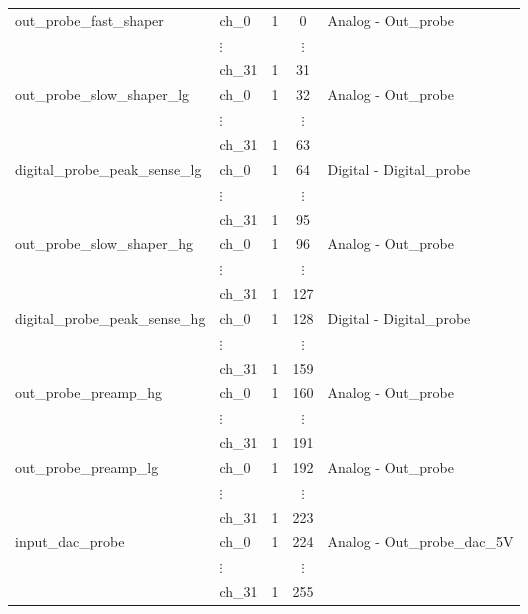 \begin{longtable}{|p{5cm}|p{2cm}|c|c|p{6cm}|}
    out\_probe\_fast\_shaper       & ch\_0   & 1 & 0   & Analog - Out\_probe \\
                                   & $\vdots$ &   & $\vdots$ & \\ %
                                   & ch\_31  & 1 & 31  &  \\
    \hline
    out\_probe\_slow\_shaper\_lg  & ch\_0   & 1 & 32  & Analog - Out\_probe \\
                                   & $\vdots$ &   & $\vdots$ & \\ %
                                   & ch\_31  & 1 & 63  &  \\
    \hline
    digital\_probe\_peak\_sense\_lg & ch\_0   & 1 & 64  & Digital - Digital\_probe \\
                                   & $\vdots$ &   & $\vdots$ & \\ %
                                   & ch\_31  & 1 & 95   \\
    \hline
    out\_probe\_slow\_shaper\_hg  & ch\_0   & 1 & 96  & Analog - Out\_probe \\
                                   & $\vdots$ &   & $\vdots$ & \\ %
                                   & ch\_31  & 1 & 127 & \\
    \hline
    digital\_probe\_peak\_sense\_hg & ch\_0   & 1 & 128 & Digital - Digital\_probe \\
                                   & $\vdots$ &   & $\vdots$ & \\ %
                                   & ch\_31  & 1 & 159 &  \\
    \hline
    out\_probe\_preamp\_hg        & ch\_0   & 1 & 160 & Analog - Out\_probe \\
                                   & $\vdots$ &   & $\vdots$ & \\ %
                                   & ch\_31  & 1 & 191 &  \\
    \hline
    out\_probe\_preamp\_lg        & ch\_0   & 1 & 192 & Analog - Out\_probe \\
                                   & $\vdots$ &   & $\vdots$ & \\ %
                                   & ch\_31  & 1 & 223 &  \\
    \hline
    input\_dac\_probe             & ch\_0   & 1 & 224 & Analog - Out\_probe\_dac\_5V \\
                                   & $\vdots$ &   & $\vdots$ & \\ %
                                   & ch\_31  & 1 & 255 & \\
    
    \end{longtable}